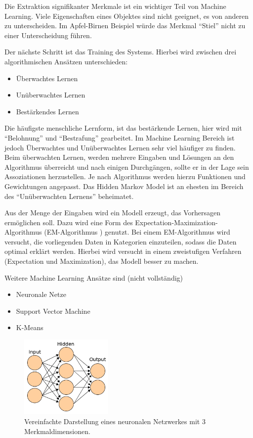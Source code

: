 Die Extraktion signifikanter Merkmale ist ein wichtiger Teil von Machine Learning. Viele Eigenschaften eines Objektes sind nicht geeignet, es von anderen zu unterscheiden. Im Apfel-Birnen Beispiel würde das Merkmal ``Stiel'' nicht zu einer Unterscheidung führen.

Der nächste Schritt ist das Training des Systems. Hierbei wird zwischen drei algorithmischen Ansätzen unterschieden:
\begin{itemize}
\item Überwachtes Lernen
\item Unüberwachtes Lernen
\item Bestärkendes Lernen
\end{itemize}
Die häufigste menschliche Lernform, ist das bestärkende Lernen, hier wird mit ``Belohnung'' und ``Bestrafung'' gearbeitet. 
Im Machine Learning Bereich ist jedoch Überwachtes und Unüberwachtes Lernen sehr viel häufiger zu finden. Beim überwachten Lernen, werden mehrere Eingaben und Lösungen an den Algorithmus überreicht und nach einigen Durchgängen, sollte er in der Lage  sein Assoziationen herzustellen. Je nach Algorithmus werden hierzu Funktionen und Gewichtungen angepasst. Das Hidden Markov Model ist an ehesten im Bereich des ``Unüberwachten Lernens'' beheimatet. 

Aus der Menge der Eingaben wird ein Modell erzeugt, das Vorhersagen ermöglichen soll. Dazu wird eine Form des Expectation-Maximization-Algorithmus (EM-Algorithmus \cite{emalgo}) genutzt. Bei einem EM-Algorithmus wird versucht, die vorliegenden Daten in Kategorien einzuteilen, sodass die Daten optimal erklärt werden. Hierbei wird versucht in einem zweistufigen Verfahren (Expectation und Maximization), das Modell besser zu machen. 

Weitere Machine Learning Ansätze sind (nicht vollständig) 
\begin{itemize}
\item Neuronale Netze
\item Support Vector Machine
\item K-Means
\end{itemize} 

\begin{figure}[htbp] \centering
    \includegraphics[width=0.4\textwidth]{Bilder/Kap1/neuralnetwork}
    \caption{ Vereinfachte Darstellung eines neuronalen Netzwerkes mit 3 Merkmaldimensionen. }
    \label{fig:neural}
\end{figure}

